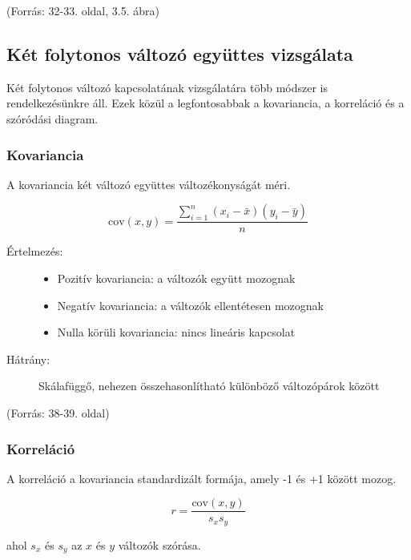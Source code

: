 \documentclass[a4paper,12pt]{article}
\begin{document}
    (Forrás: 32-33. oldal, 3.5. ábra)

    \subsection{Két folytonos változó együttes vizsgálata}

    Két folytonos változó kapcsolatának vizsgálatára több módszer is rendelkezésünkre áll. Ezek közül a legfontosabbak a kovariancia, a korreláció és a szóródási diagram.

    \subsubsection{Kovariancia}

    A kovariancia két változó együttes változékonyságát méri.

    \begin{equation}
        \text{cov}(x,y) = \frac{\sum_{i=1}^n (x_i - \bar{x})(y_i - \bar{y})}{n}
    \end{equation}

    \begin{description}
        \item[Értelmezés:]
        \begin{itemize}
            \item Pozitív kovariancia: a változók együtt mozognak
            \item Negatív kovariancia: a változók ellentétesen mozognak
            \item Nulla körüli kovariancia: nincs lineáris kapcsolat
        \end{itemize}
        \item[Hátrány:] Skálafüggő, nehezen összehasonlítható különböző változópárok között
    \end{description}

    (Forrás: 38-39. oldal)

    \subsubsection{Korreláció}

    A korreláció a kovariancia standardizált formája, amely -1 és +1 között mozog.

    \begin{equation}
        r = \frac{\text{cov}(x,y)}{s_x s_y}
    \end{equation}

    ahol $s_x$ és $s_y$ az $x$ és $y$ változók szórása.
\end{document}
